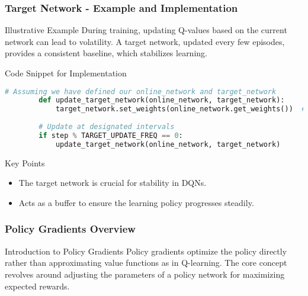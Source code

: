 \documentclass[aspectratio=169]{beamer}
\begin{document}
\begin{frame}[fragile]
    \frametitle{Target Network - Example and Implementation}
    \begin{block}{Illustrative Example}
        During training, updating Q-values based on the current network can lead to volatility. A target network, updated every few episodes, provides a consistent baseline, which stabilizes learning.
    \end{block}

    \begin{block}{Code Snippet for Implementation}
        \begin{lstlisting}[language=Python]
        # Assuming we have defined our online_network and target_network
        def update_target_network(online_network, target_network):
            target_network.set_weights(online_network.get_weights())  # Copy weights
        
        # Update at designated intervals
        if step % TARGET_UPDATE_FREQ == 0:
            update_target_network(online_network, target_network)
        \end{lstlisting}
    \end{block}
    
    \begin{block}{Key Points}
        \begin{itemize}
            \item The target network is crucial for stability in DQNs.
            \item Acts as a buffer to ensure the learning policy progresses steadily.
        \end{itemize}
    \end{block}
\end{frame}

\begin{frame}[fragile]
    \frametitle{Policy Gradients Overview}
    
    \begin{block}{Introduction to Policy Gradients}
        Policy gradients optimize the policy directly rather than approximating value functions as in Q-learning. The core concept revolves around adjusting the parameters of a policy network for maximizing expected rewards.
    \end{block}
    
\end{frame}
\end{document}
